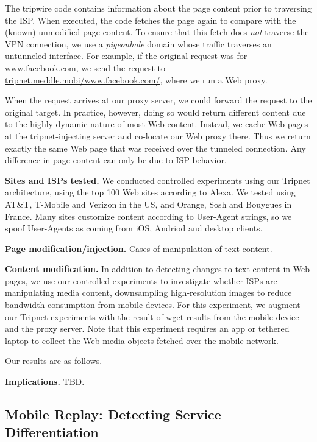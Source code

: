 The tripwire code contains information about the page content prior to traversing the ISP. When 
executed, the code fetches the page again to compare with the (known) unmodified page content.  
To ensure that this fetch does \emph{not} traverse the VPN connection, we use a \emph{pigeonhole} domain 
whose traffic traverses an untunneled interface. For example, if the original request was for \url{www.facebook.com}, 
we send the request to \url{tripnet.meddle.mobi/www.facebook.com/}, where we run a Web proxy. 

When the request arrives at our proxy server, we could forward the request to the original target. In 
practice, however, doing so would return different content due to the highly dynamic nature of most 
Web content. Instead, we cache Web pages at the tripnet-injecting server and co-locate our Web proxy 
there. Thus we return exactly the same Web page that was received over the tunneled connection. 
Any difference in page content can only be due to ISP behavior. 


\noindent\textbf{Sites and ISPs tested.} We conducted controlled experiments using our Tripnet 
architecture, using the top 100 Web sites according to Alexa. We tested using 
AT\&T, T-Mobile and Verizon in the US, and Orange, Sosh and Bouygues in France. 
Many sites customize content according to User-Agent strings, so we spoof User-Agents 
as coming from iOS, Andriod and desktop clients.

\noindent\textbf{Page modification/injection.} Cases of manipulation of text content.

\noindent\textbf{Content modification.} In addition to detecting changes to text content in 
Web pages, we use our controlled experiments to investigate whether ISPs are manipulating 
media content, \eg downsampling high-resolution images to reduce bandwidth consumption 
from mobile devices. For this experiment, we augment our Tripnet experiments with the result 
of wget results from the mobile device and the proxy server. Note that this experiment requires an 
app or tethered laptop to collect the Web media objects fetched over the mobile network.

Our results are as follows.

\noindent\textbf{Implications.} TBD.


\subsection{Mobile Replay: Detecting Service Differentiation}

